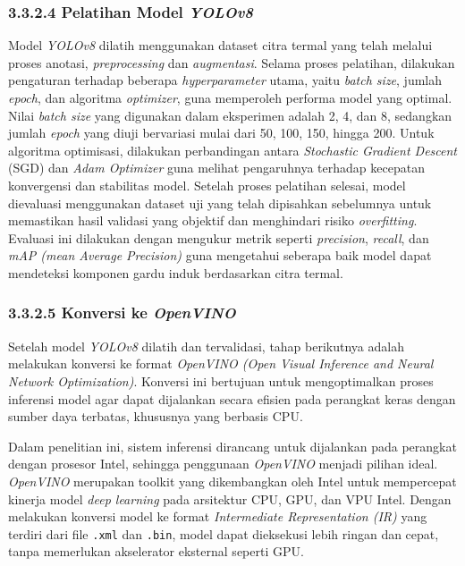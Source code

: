 \subsubsection{3.3.2.4 Pelatihan Model \emph{YOLOv8}}

Model \emph{YOLOv8} dilatih menggunakan dataset citra termal yang telah melalui proses anotasi, \emph{preprocessing} dan \emph{augmentasi}. Selama proses pelatihan, dilakukan pengaturan terhadap beberapa \emph{hyperparameter} utama, yaitu \emph{batch size}, jumlah \emph{epoch}, dan algoritma \emph{optimizer}, guna memperoleh performa model yang optimal. Nilai \emph{batch size} yang digunakan dalam eksperimen adalah 2, 4, dan 8, sedangkan jumlah \emph{epoch} yang diuji bervariasi mulai dari 50, 100, 150, hingga 200. Untuk algoritma optimisasi, dilakukan perbandingan antara \emph{Stochastic Gradient Descent} (SGD) dan \emph{Adam Optimizer} guna melihat pengaruhnya terhadap kecepatan konvergensi dan stabilitas model.  Setelah proses pelatihan selesai, model dievaluasi menggunakan dataset uji yang telah dipisahkan sebelumnya untuk memastikan hasil validasi yang objektif dan menghindari risiko \emph{overfitting}. Evaluasi ini dilakukan dengan mengukur metrik seperti \emph{precision}, \emph{recall}, dan \emph{mAP (mean Average Precision)} guna mengetahui seberapa baik model dapat mendeteksi komponen gardu induk berdasarkan citra termal.


\subsubsection{3.3.2.5 Konversi ke \emph{OpenVINO}}
Setelah model \emph{YOLOv8} dilatih dan tervalidasi, tahap berikutnya adalah melakukan konversi ke format \emph{OpenVINO (Open Visual Inference and Neural Network Optimization)}. Konversi ini bertujuan untuk mengoptimalkan proses inferensi model agar dapat dijalankan secara efisien pada perangkat keras dengan sumber daya terbatas, khususnya yang berbasis CPU.

Dalam penelitian ini, sistem inferensi dirancang untuk dijalankan pada perangkat dengan prosesor Intel, sehingga penggunaan \emph{OpenVINO} menjadi pilihan ideal. \emph{OpenVINO} merupakan toolkit yang dikembangkan oleh Intel untuk mempercepat kinerja model \emph{deep learning} pada arsitektur CPU, GPU, dan VPU Intel. Dengan melakukan konversi model ke format \emph{Intermediate Representation (IR)} yang terdiri dari file \texttt{.xml} dan \texttt{.bin}, model dapat dieksekusi lebih ringan dan cepat, tanpa memerlukan akselerator eksternal seperti GPU.

